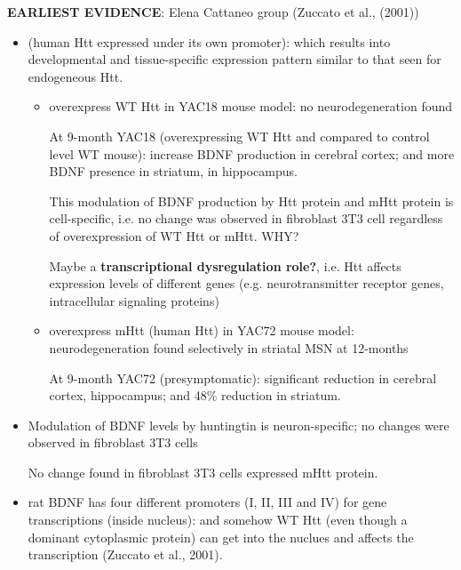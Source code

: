 {\bf EARLIEST EVIDENCE}: Elena Cattaneo group (Zuccato et al., (2001))
\begin{itemize} 
  
  \item (human Htt expressed under its own promoter): which results into
  developmental and tissue-specific expression pattern similar to that seen
  for endogeneous Htt.
  
  \begin{itemize}
    \item  overexpress WT Htt  in YAC18 mouse model: no neurodegeneration found

     At 9-month YAC18 (overexpressing WT Htt and compared to
     control level WT mouse):
     increase BDNF production in cerebral cortex; and more BDNF presence in
     striatum, in hippocampus.
  
     This modulation of BDNF production by Htt protein and mHtt protein is
     cell-specific, i.e. no change was observed in fibroblast 3T3 cell
     regardless of overexpression of WT Htt or mHtt. WHY?
     
     Maybe a {\bf transcriptional dysregulation role?}, i.e. Htt affects
     expression levels of different genes (e.g. neurotransmitter
     receptor genes, intracellular signaling proteins)
  
     \item overexpress mHtt (human Htt) in YAC72 mouse model: neurodegeneration
     found selectively in striatal MSN at 12-months
     
     At 9-month YAC72 (presymptomatic): significant reduction in cerebral
     cortex, hippocampus; and 48\% reduction in striatum. 
  \end{itemize}
  
  
  \item  Modulation of BDNF levels by huntingtin is neuron-specific; no changes
  were observed in fibroblast 3T3 cells

No change found in fibroblast 3T3 cells expressed mHtt protein.
  
  \item rat BDNF has four different promoters (I, II, III and IV) for gene
  transcriptions (inside nucleus): and somehow WT Htt (even though a dominant
  cytoplasmic protein) can get into the nuclues and affects the transcription
  (Zuccato et al., 2001).
  
  
\end{itemize}

